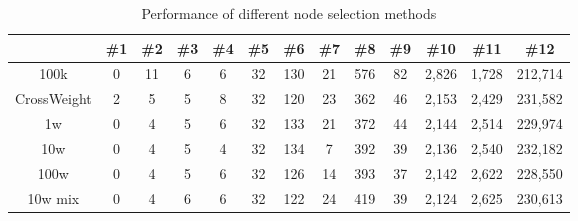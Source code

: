 \documentclass[]{llncs}
\begin{document}
\begin{table}
\centering
\caption{Performance of different node selection methods}
\begin{tabular}{|c|c|c|c|c|c|c|c|c|c|c|c|c|}
	\hline 
	& \#1 & \#2 & \#3 & \#4 & \#5 & \#6 & \#7 & \#8 & \#9 & \#10 & \#11 & \#12 \\
	\hline 
	100k & 0 & 11 & 6 & 6 & 32 & 130 & 21 & 576 & 82 & 2,826 & 1,728 & 212,714 \\
    \hline
	CrossWeight & 2 & 5 & 5 & 8 & 32 & 120 & 23 & 362 & 46 & 2,153 & 2,429 & 231,582 \\
	\hline
	1w & 0 & 4 & 5 & 6 & 32 & 133 & 21 & 372 & 44 & 2,144 & 2,514 & 229,974 \\
	\hline
	10w & 0 & 4 & 5 & 4 & 32 & 134 & 7 & 392 & 39 & 2,136 & 2,540 & 232,182 \\
	\hline
	100w & 0 & 4 & 5 & 6 & 32 & 126 & 14 & 393 & 37 & 2,142 & 2,622 & 228,550 \\
	\hline
	10w mix & 0 & 4 & 6 & 6 & 32 & 122 & 24 & 419 & 39 & 2,124 & 2,625 & 230,613 \\
	\hline
\end{tabular}
\label{select-res}
\end{table}
\end{document}
